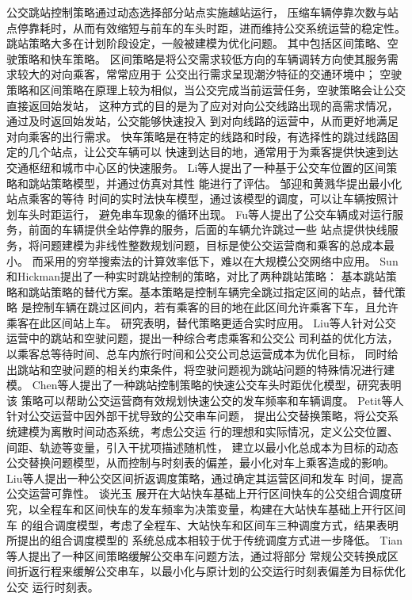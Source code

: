 公交跳站控制策略通过动态选择部分站点实施越站运行，
压缩车辆停靠次数与站点停靠耗时，从而有效缩短与前车的车头时距，进而维持公交系统运营的稳定性。跳站策略大多在计划阶段设定，一般被建模为优化问题。
其中包括区间策略、空驶策略和快车策略。
区间策略是将公交需求较低方向的车辆调转方向使其服务需求较大的对向乘客，常常应用于
公交出行需求呈现潮汐特征的交通环境中；
空驶策略和区间策略在原理上较为相似，当公交完成当前运营任务，空驶策略会让公交直接返回始发站，
这种方式的目的是为了应对对向公交线路出现的高需求情况，通过及时返回始发站，公交能够快速投入
到对向线路的运营中，从而更好地满足对向乘客的出行需求。
快车策略是在特定的线路和时段，有选择性的跳过线路固定的几个站点，让公交车辆可以
快速到达目的地，通常用于为乘客提供快速到达交通枢纽和城市中心区的快速服务。
Li等人\cite{li1995real}提出了一种基于公交车位置的区间策略和跳站策略模型，并通过仿真对其性
能进行了评估。
邹迎和黄溅华\cite{邹迎2002公共交通调度实时发快车模型研究}提出最小化站点乘客的等待
时间的实时法快车模型，通过该模型的调度，可以让车辆按照计划车头时距运行，
避免串车现象的循环出现。
Fu等人\cite{fu2003real}提出了公交车辆成对运行服务，前面的车辆提供全站停靠的服务，后面的车辆允许跳过一些
站点提供快线服务，将问题建模为非线性整数规划问题，目标是使公交运营商和乘客的总成本最小。
而采用的穷举搜索法的计算效率低下，难以在大规模公交网络中应用。
Sun和Hickman\cite{sun2005real}提出了一种实时跳站控制的策略，对比了两种跳站策略：
基本跳站策略和跳站策略的替代方案。基本策略是控制车辆完全跳过指定区间的站点，替代策略
是控制车辆在跳过区间内，若有乘客的目的地在此区间允许乘客下车，且允许乘客在此区间站上车。
研究表明，替代策略更适合实时应用。
Liu等人\cite{liu2013bus}针对公交运营中的跳站和空驶问题，提出一种综合考虑乘客和公交公
司利益的优化方法，以乘客总等待时间、总车内旅行时间和公交公司总运营成本为优化目标，
同时给出跳站和空驶问题的相关约束条件，将空驶问题视为跳站问题的特殊情况进行建模。
Chen等人\cite{chen2015optimization}提出了一种跳站控制策略的快速公交车头时距优化模型，研究表明该
策略可以帮助公交运营商有效规划快速公交的发车频率和车辆调度。
Petit等人\cite{petit2018dynamic}针对公交运营中因外部干扰导致的公交串车问题，
提出公交替换策略，将公交系统建模为离散时间动态系统，考虑公交运
行的理想和实际情况，定义公交位置、间距、轨迹等变量，引入干扰项描述随机性，
建立以最小化总成本为目标的动态公交替换问题模型，从而控制与时刻表的偏差，最小化对车上乘客造成的影响。
Liu等人\cite{liu2020short}提出一种公交区间折返调度策略，通过确定其运营区间和发车
时间，提高公交运营可靠性。
谈光玉\cite{谈光玉2020在大站快车基础上开行区间车的公交组合调度研究}
展开在大站快车基础上开行区间快车的公交组合调度研究，以全程车和区间快车的发车频率为决策变量，构建在大站快车基础上开行区间车
的组合调度模型，考虑了全程车、大站快车和区间车三种调度方式，结果表明所提出的组合调度模型的
系统总成本相较于优于传统调度方式进一步降低。
Tian等人\cite{tian2022short}提出了一种区间策略缓解公交串车问题方法，通过将部分
常规公交转换成区间折返行程来缓解公交串车，以最小化与原计划的公交运行时刻表偏差为目标优化公交
运行时刻表。

